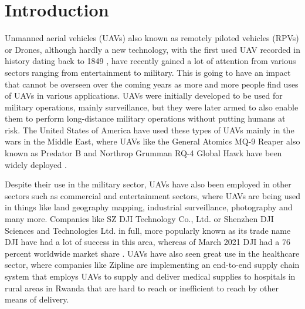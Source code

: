 


\chapter{Introduction}
\label{chap:thesis-introduction}

Unmanned aerial vehicles (UAVs) also known as remotely piloted vehicles (RPVs) or Drones, although hardly a new technology, with the first used UAV recorded in history dating back to 1849 \cite{vasileprisacariujdrm2017}, have recently gained a lot of attention from various sectors ranging from entertainment to military. This is going to have an impact that cannot be overseen over the coming years as more and more people find uses of UAVs in various applications. UAVs were initially developed to be used for military operations, mainly surveillance, but they were later armed to also enable them to perform long-distance military operations without putting humans at risk. The United States of America have used these types of UAVs mainly in the wars in the Middle East, where UAVs like the General Atomics MQ-9 Reaper also known as Predator B and Northrop Grumman RQ-4 Global Hawk have been widely deployed \cite{samaanorientxxi2022}.

Despite their use in the military sector, UAVs have also been employed in other sectors such as commercial and entertainment sectors, where UAVs are being used in things like land geography mapping, industrial surveillance, photography and many more. Companies like SZ DJI Technology Co., Ltd. or Shenzhen DJI Sciences and Technologies Ltd. in full, more popularly known as its trade name DJI have had a lot of success in this area, whereas of March 2021 DJI had a 76 percent worldwide market share \cite{djimarketshare2021}. UAVs have also seen great use in the healthcare sector, where companies like Zipline \cite{droneslevy2022} are implementing an end-to-end supply chain system that employs UAVs to supply and deliver medical supplies to hospitals in rural areas in Rwanda that are hard to reach or inefficient to reach by other means of delivery.

